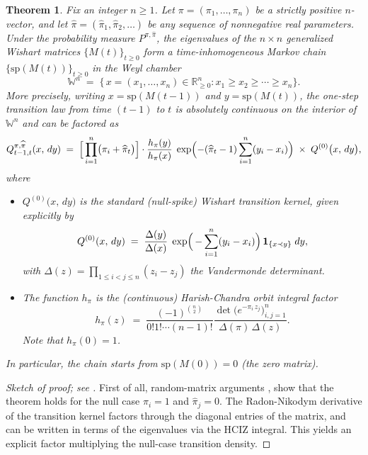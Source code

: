 \documentclass[letterpaper,11pt,oneside,reqno]{article}
\numberwithin{equation}{section}
\newtheorem{theorem}[proposition]{Theorem}
\theoremstyle{definition}
\begin{document}
\begin{theorem}
\label{thm:MarkovChain}
Fix an integer \(n\ge1\).  Let \(\pi=(\pi_1,\dots,\pi_n)\) be a strictly positive \(n\)-vector, and let \(\widehat\pi=(\widehat\pi_1,\widehat\pi_2,\dots)\) be any sequence of nonnegative real parameters.  Under the probability measure \(P^{\pi,\widehat\pi}\), the eigenvalues of the \(n\times n\) generalized Wishart matrices \(\{M(t)\}_{t\ge0}\) form a time-inhomogeneous Markov chain \(\{\mathrm{sp}(M(t))\}_{t\ge0}\) in the Weyl chamber
\[
\mathbb{W}^n
\;=\;
\bigl\{\,x=(x_1,\dots,x_n)\in\mathbb{R}^n_{\ge0}:
x_1\ge x_2\ge\cdots\ge x_n\bigr\}.
\]
More precisely, writing \(x=\mathrm{sp}(M(t-1))\) and \(y=\mathrm{sp}(M(t))\), the one-step transition law from time \((t-1)\) to \(t\) is absolutely continuous on the interior of \(\mathbb{W}^n\) and can be factored as
\begin{equation}
\label{eq:transition-density}
Q_{t-1,t}^{\pi,\widehat\pi}(x,\,dy)
\;=\;
\Bigl[\,
\prod_{i=1}^n \bigl(\pi_i+\widehat\pi_{t}\bigr)
\Bigr]
\cdot
\frac{h_{\pi}(y)}{h_{\pi}(x)}
\;\exp\Bigl(-(\widehat\pi_{t}-1)\sum_{i=1}^n (y_i - x_i)\Bigr)
\;\times\;Q^{(0)}\bigl(x,\,dy\bigr),
\end{equation}
where
\begin{itemize}
\item \(\displaystyle Q^{(0)}\bigl(x,\,dy\bigr)\) is the \emph{standard} (null-spike) Wishart transition kernel, given explicitly by
	\begin{equation}
		\label{eq:Q0}
Q^{(0)}(x,\,dy)
\;=\;
\frac{\Delta(y)}{\Delta(x)}\;\exp\Bigl(\,-\sum_{i=1}^n (y_i - x_i)\Bigr)\,
\mathbf{1}_{\{x\prec y\}}\;dy,
\end{equation}
with \(\Delta(z)=\prod_{1\le i<j\le n}(z_i - z_j)\) the Vandermonde determinant.

\item The function \(h_{\pi}\) is the (continuous) Harish-Chandra orbit integral factor
\[
h_{\pi}(z)
\;=\;
\frac{(-1)^{\binom n2}}{0! 1! \cdots (n-1)! }
\frac{\det\bigl(e^{-\pi_i\,z_j}\bigr)_{i,j=1}^n}{\Delta(\pi)\,\Delta(z)}.
\]
Note that $h_\pi(0)=1$.
\end{itemize}
In particular, the chain starts from \(\mathrm{sp}(M(0))=0\) (the zero matrix).
\end{theorem}

\begin{proof}[Sketch of proof; see \cite{dieker2008largest}]
	First of all, random-matrix arguments
	\cite{defosseux2010orbit}, \cite{forrester2006jacobians} show that the
	theorem holds for the null case $\pi_i=1$ and $\hat\pi_j=0$.
	The Radon-Nikodym derivative of the transition kernel
	factors through the diagonal entries of the matrix,
	and can be written in terms of the eigenvalues via
	the HCIZ integral.
	This yields an explicit factor multiplying the null-case
	transition density.
\end{proof}
\end{document}
